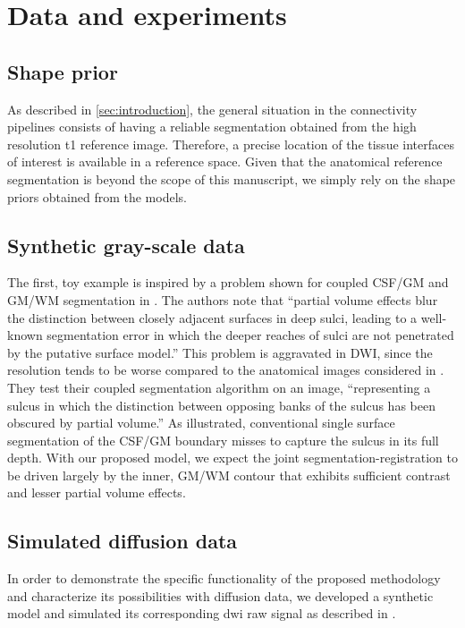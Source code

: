 \section{Data and experiments}
\label{sec:experiments}
%
\subsection{Shape prior}
%
As described in \autoref{sec:introduction}, the general situation in
the connectivity pipelines consists of having 
a reliable segmentation obtained from the high resolution \ac{t1} 
reference image. Therefore, a precise location of the tissue interfaces
of interest is available in a reference space. Given that the anatomical 
reference segmentation is beyond the scope of this manuscript, we simply 
rely on the shape priors obtained from the models.
%
\subsection{Synthetic gray-scale data}
%
The first, toy example is inspired by a problem shown for coupled CSF/GM and GM/WM 
segmentation in \cite{macdonald_automated_2000}. The authors note that ``partial 
volume effects blur the distinction between closely adjacent surfaces in deep sulci,
leading to a well-known segmentation error in which the deeper reaches of sulci are 
not penetrated by the putative surface model.'' This problem is aggravated in DWI, 
since the resolution tends to be worse compared to the anatomical images considered 
in \cite{macdonald_automated_2000}. They test their coupled segmentation algorithm 
on an image, ``representing a sulcus in which the distinction between opposing banks 
of the sulcus has been obscured by partial volume.''  As illustrated, conventional 
single surface segmentation of the CSF/GM boundary misses to capture the sulcus in 
its full depth. With our proposed model, we expect the joint segmentation-registration 
to be driven largely by the inner, GM/WM contour that exhibits sufficient contrast 
and lesser partial volume effects.
%
\subsection{Simulated diffusion data}
%
In order to demonstrate the specific functionality of the proposed
methodology and characterize its possibilities with diffusion data, we developed a
synthetic model and simulated its corresponding \ac{dwi}
raw signal as described in \citep{tuch_q-ball_2004}. 

